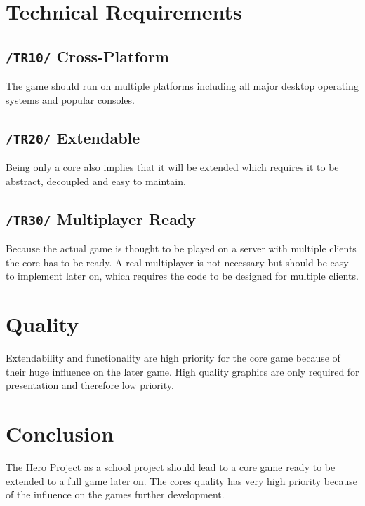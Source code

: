 \documentclass[11pt]{article}
\begin{document}
\section{Technical Requirements}\label{sec:tr}
\subsection{\texttt{/TR10/} Cross-Platform}
The game should run on multiple platforms including all major desktop operating systems and popular consoles.
\subsection{\texttt{/TR20/} Extendable}
Being only a core also implies that it will be extended which requires it to be abstract, decoupled and easy to maintain.
\subsection{\texttt{/TR30/} Multiplayer Ready}
Because the actual game is thought to be played on a server with multiple clients the core has to be ready.
A real multiplayer is not necessary but should be easy to implement later on, which requires the code to be designed for multiple clients.

\section{Quality}
Extendability and functionality are high priority for the core game because of their huge influence on the later game.
High quality graphics are only required for presentation and therefore low priority.

\section{Conclusion}
The Hero Project as a school project should lead to a core game ready to be extended to a full game later on.
The cores quality has very high priority because of the influence on the games further development.
\end{document}

